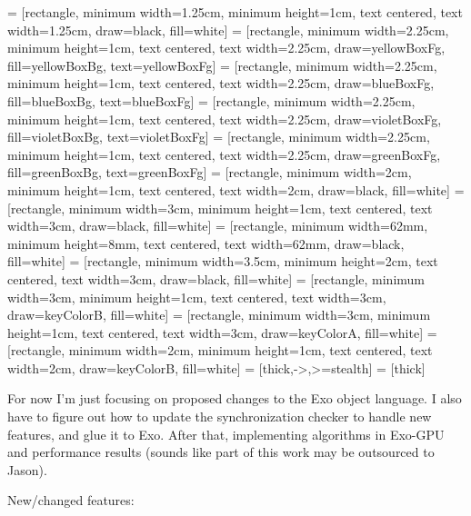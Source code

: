 

 = [rectangle, minimum width=1.25cm, minimum height=1cm, text centered, text width=1.25cm, draw=black, fill=white]
 = [rectangle, minimum width=2.25cm, minimum height=1cm, text centered, text width=2.25cm, draw=yellowBoxFg, fill=yellowBoxBg, text=yellowBoxFg]
 = [rectangle, minimum width=2.25cm, minimum height=1cm, text centered, text width=2.25cm, draw=blueBoxFg, fill=blueBoxBg, text=blueBoxFg]
 = [rectangle, minimum width=2.25cm, minimum height=1cm, text centered, text width=2.25cm, draw=violetBoxFg, fill=violetBoxBg, text=violetBoxFg]
 = [rectangle, minimum width=2.25cm, minimum height=1cm, text centered, text width=2.25cm, draw=greenBoxFg, fill=greenBoxBg, text=greenBoxFg]
 = [rectangle, minimum width=2cm, minimum height=1cm, text centered, text width=2cm, draw=black, fill=white]
 = [rectangle, minimum width=3cm, minimum height=1cm, text centered, text width=3cm, draw=black, fill=white]
 = [rectangle, minimum width=62mm, minimum height=8mm, text centered, text width=62mm, draw=black, fill=white]
 = [rectangle, minimum width=3.5cm, minimum height=2cm, text centered, text width=3cm, draw=black, fill=white]
 = [rectangle, minimum width=3cm, minimum height=1cm, text centered, text width=3cm, draw=keyColorB, fill=white]
 = [rectangle, minimum width=3cm, minimum height=1cm, text centered, text width=3cm, draw=keyColorA, fill=white]
 = [rectangle, minimum width=2cm, minimum height=1cm, text centered, text width=2cm, draw=keyColorB, fill=white]
 = [thick,->,>=stealth]
 = [thick]



For now I'm just focusing on proposed changes to the Exo object language.
I also have to figure out how to update the synchronization checker to handle new features, and glue it to Exo.
After that, implementing algorithms in Exo-GPU and performance results (sounds like part of this work may be outsourced to Jason).

New/changed features:

